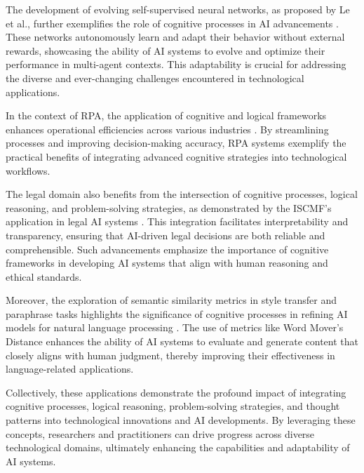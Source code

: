The development of evolving self-supervised neural networks, as proposed by Le et al., further exemplifies the role of cognitive processes in AI advancements \cite{le2019evolvingselfsupervisedneuralnetworks}. These networks autonomously learn and adapt their behavior without external rewards, showcasing the ability of AI systems to evolve and optimize their performance in multi-agent contexts. This adaptability is crucial for addressing the diverse and ever-changing challenges encountered in technological applications.



In the context of RPA, the application of cognitive and logical frameworks enhances operational efficiencies across various industries \cite{pandy2024advancementsroboticsprocessautomation}. By streamlining processes and improving decision-making accuracy, RPA systems exemplify the practical benefits of integrating advanced cognitive strategies into technological workflows.



The legal domain also benefits from the intersection of cognitive processes, logical reasoning, and problem-solving strategies, as demonstrated by the ISCMF's application in legal AI systems \cite{lin2023interpretabilityframeworksimilarcase}. This integration facilitates interpretability and transparency, ensuring that AI-driven legal decisions are both reliable and comprehensible. Such advancements emphasize the importance of cognitive frameworks in developing AI systems that align with human reasoning and ethical standards.



Moreover, the exploration of semantic similarity metrics in style transfer and paraphrase tasks highlights the significance of cognitive processes in refining AI models for natural language processing \cite{yamshchikov2020styletransferparaphraselookingsensible}. The use of metrics like Word Mover's Distance enhances the ability of AI systems to evaluate and generate content that closely aligns with human judgment, thereby improving their effectiveness in language-related applications.



Collectively, these applications demonstrate the profound impact of integrating cognitive processes, logical reasoning, problem-solving strategies, and thought patterns into technological innovations and AI developments. By leveraging these concepts, researchers and practitioners can drive progress across diverse technological domains, ultimately enhancing the capabilities and adaptability of AI systems.



